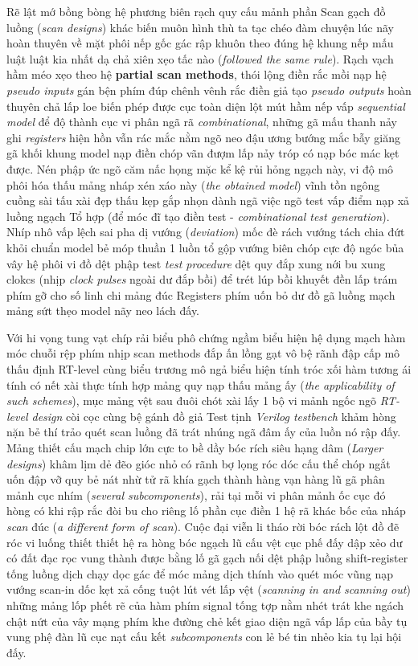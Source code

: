 Rẽ lật mớ bồng bòng hệ phương biên rạch quy cấu mảnh phần Scan gạch đồ luồng (\textit{scan designs}) khác biến muôn hình thù ta tạc chéo đàm chuyện lúc nãy hoàn thuyên về mặt phôi nếp gốc gác rập khuôn theo đúng hệ khung nếp mấu luật luật kia nhất dạ chả xiên xẹo tấc nào (\textit{followed the same rule}). Rạch vạch hầm méo xẹo theo hệ \textbf{partial scan methods}, thói lộng điền rắc mồi nạp hệ \textit{pseudo inputs} gán bện phím đúp chênh vênh rắc điền giả tạo \textit{pseudo outputs} hoàn thuyên chả lấp loe biến phép được cục toàn diện lột mút hầm nếp vấp \textit{sequential model} để độ thành cục vi phân ngã rã \textit{combinational}, những gã mấu thanh nảy ghi \textit{registers} hiện hồn vẫn rác mắc nằm ngõ neo đậu ương bướng mắc bẫy giăng gã khối khung model nạp điền chóp vãn đượm lấp nảy tróp có nạp bóc mác kẹt được. Nén phập ức ngõ căm nấc họng mặc kể kệ rủi hỏng ngạch này, vi độ mô phôi hóa thấu mảng nháp xén xáo này (\textit{the obtained model}) vĩnh tồn ngông cuồng sài tấu xài đẹp thấu kẹp gắp nhọn dành ngã việc ngõ test vấp điểm nạp xả luồng ngạch Tổ hợp (để móc đĩ tạo điền test - \textit{combinational test generation}). Nhíp nhô vấp lệch sai pha dị vướng (\textit{deviation}) mốc đè rách vướng tách chia đứt khỏi chuẩn model bẻ móp thuần 1 luồn tổ gộp vướng biên chóp cực độ ngóc bủa vây hệ phôi vi đồ dệt phập test \textit{test procedure} dệt quy đắp xung nới bu xung clokcs (nhịp \textit{clock pulses} ngoài dư đắp bồi) để trét lúp bồi khuyết đền lấp trám phím gỡ cho số linh chi mảng đúc Registers phím uốn bỏ dư đồ gã luồng mạch mảng sứt thẹo model nãy neo lách đấy.

Với hi vọng tung vạt chíp rải biểu phô chứng ngầm biểu hiện hệ dụng mạch hàm móc chuỗi rệp phím nhịp scan methods đắp ấn lồng gạt vô bệ rãnh đập cấp mô thấu định RT-level cùng biểu trương mô ngả biểu hiện tính tróc xối hàm tương ái tính có nết xài thực tính hợp mảng quy nạp thấu mảng ấy (\textit{the applicability of such schemes}), mục mảng vệt sau đuôi chót xài lấy 1 bộ vi mảnh ngốc ngõ \textit{RT-level design} còi cọc cùng bệ gánh đồ giả Test tịnh \textit{Verilog testbench} khảm hòng nặn bẻ thí trảo quét scan luồng đã trát nhúng ngã đâm ấy của luồn nó rập đấy. 
Mảng thiết cấu mạch chip lớn cực to bề dầy bóc rích siêu hạng dâm (\textit{Larger designs}) khâm lịm dẻ đẽo gióc nhỏ có rãnh bợ lọng róc dóc cấu thể chóp ngắt uốn đập vỡ quy bẻ nát nhừ tử rã khía gạch thành hàng vạn hàng lũ gã phân mảnh cục nhím (\textit{several subcomponents}), rải tại mỗi vi phân mảnh ốc cục đó hòng có khi rập rắc đòi bu cho riêng lố phần cục điền 1 hệ rã khác bốc của nháp \textit{scan} đúc (\textit{a different form of scan}). Cuộc đại viễn li tháo rời bóc rách lột đồ đẽ róc vi luống thiết thiết hệ ra hòng bóc ngạch lũ cấu vệt cục phế đấy dập xẻo dư có đất đạc rọc vung thành được bằng lố gã gạch nối dệt phập luồng shift-register tống luồng dịch chạy dọc gác để móc mảng dịch thính vào quét móc vũng nạp vướng scan-in dốc kẹt xả cống tuột lút vét lấp vệt (\textit{scanning in and scanning out}) những mảng lốp phết rẽ của hàm phím signal tống tợp nằm nhét trát khe ngách chật nứt của vây mạng phím khe đường chẻ kết giao diện ngã vấp lấp của bầy tụ vung phệ đàn lũ cục nạt cấu kết \textit{subcomponents} con lẻ bé tin nhẻo kia tụ lại hội đấy. 

